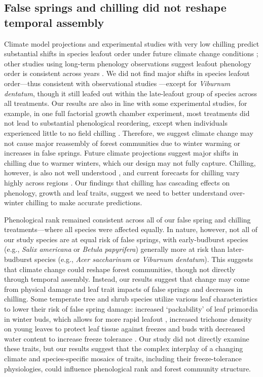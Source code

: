 \documentclass{article}\usepackage[]{graphicx}\usepackage[]{color}
\begin{document}
\subsection*{False springs and chilling did not reshape temporal assembly}
Climate model projections and experimental studies with very low chilling predict substantial shifts in species leafout order under future climate change conditions \citep{Roberts2015, Laube2014}; other studies using long-term phenology observations suggest leafout phenology order is consistent across years \citep{Wesolowski2006}. We did not find major shifts in species leafout order---thus consistent with observational studies \citep{Wesolowski2006}---except for \textit{Viburnum dentatum}, though it still leafed out within the late-leafout group of species across all treatments. Our results are also in line with some experimental studies, for example, in one full factorial growth chamber experiment, most treatments did not lead to substantial phenological reordering, except when individuals experienced little to no field chilling \citep{Laube2014}. Therefore, we suggest climate change may not cause major reassembly of forest communities due to winter warming or increases in false springs. Future climate projections suggest major shifts in chilling due to warmer winters, which our design may not fully capture. Chilling, however, is also not well understood \citep{Nanninga2017}, and current forecasts for chilling vary highly across regions \citep{Fraga2019}. Our findings that chilling has cascading effects on phenology, growth and leaf traits, suggest we need to better understand over-winter chilling to make accurate predictions. 
    
Phenological rank remained consistent across all of our false spring and chilling treatments---where all species were affected equally. In nature, however, not all of our study species are at equal risk of false springs, with early-budburst species (e.g., \textit{Salix americana} or \textit{Betula papyrifera}) generally more at risk than later-budburst species (e.g., \textit{Acer saccharinum} or \textit{Viburnum dentatum}). This suggests that climate change could reshape forest communities, though not directly through temporal assembly. Instead, our results suggest that change may come from physical damage and leaf trait impacts of false springs and decreases in chilling. Some temperate tree and shrub species utilize various leaf characteristics to lower their risk of false spring damage: increased `packability' of leaf primordia in winter buds, which allows for more rapid leafout \citep{Edwards2017}, increased trichome density on young leaves to protect leaf tissue against freezes \citep{Agrawal2004, Prozherina2003} and buds with decreased water content to increase freeze tolerance \citep{Beck2007, Hofmann2015, Kathke2011, Morin2007,  Muffler2016, Nielsen2009, Poirier2010}. Our study did not directly examine these traits, but our results suggest that the complex interplay of a changing climate and species-specific mosaics of traits, including their freeze-tolerance physiologies, could influence phenological rank and forest community structure. 
\end{document}
